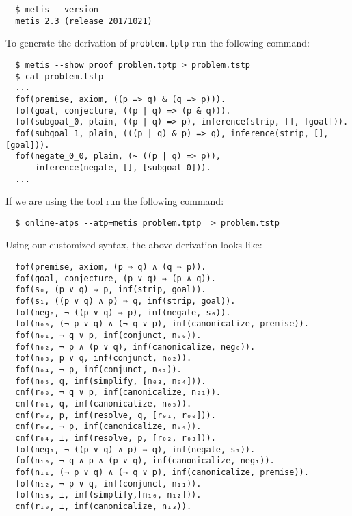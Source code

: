 \documentclass[../main.tex]{subfiles}
\begin{document}
\begin{subappendices}
\begin{verbatim}
  $ metis --version
  metis 2.3 (release 20171021)
\end{verbatim}

To generate the \TSTP derivation of \verb!problem.tptp!
run the following command:

\begin{verbatim}
  $ metis --show proof problem.tptp > problem.tstp
  $ cat problem.tstp
  ...
  fof(premise, axiom, ((p => q) & (q => p))).
  fof(goal, conjecture, ((p | q) => (p & q))).
  fof(subgoal_0, plain, ((p | q) => p), inference(strip, [], [goal])).
  fof(subgoal_1, plain, (((p | q) & p) => q), inference(strip, [], [goal])).
  fof(negate_0_0, plain, (~ ((p | q) => p)),
      inference(negate, [], [subgoal_0])).
  ...
\end{verbatim}

If we are using the  tool run the following command:

\begin{verbatim}
  $ online-atps --atp=metis problem.tptp  > problem.tstp
\end{verbatim}

Using our customized \TSTP syntax, the above \Metis derivation looks like:

\begin{verbatim}
  fof(premise, axiom, (p ⇒ q) ∧ (q ⇒ p)).
  fof(goal, conjecture, (p ∨ q) ⇒ (p ∧ q)).
  fof(s₀, (p ∨ q) ⇒ p, inf(strip, goal)).
  fof(s₁, ((p ∨ q) ∧ p) ⇒ q, inf(strip, goal)).
  fof(neg₀, ¬ ((p ∨ q) ⇒ p), inf(negate, s₀)).
  fof(n₀₀, (¬ p ∨ q) ∧ (¬ q ∨ p), inf(canonicalize, premise)).
  fof(n₀₁, ¬ q ∨ p, inf(conjunct, n₀₀)).
  fof(n₀₂, ¬ p ∧ (p ∨ q), inf(canonicalize, neg₀)).
  fof(n₀₃, p ∨ q, inf(conjunct, n₀₂)).
  fof(n₀₄, ¬ p, inf(conjunct, n₀₂)).
  fof(n₀₅, q, inf(simplify, [n₀₃, n₀₄])).
  cnf(r₀₀, ¬ q ∨ p, inf(canonicalize, n₀₁)).
  cnf(r₀₁, q, inf(canonicalize, n₀₅)).
  cnf(r₀₂, p, inf(resolve, q, [r₀₁, r₀₀])).
  cnf(r₀₃, ¬ p, inf(canonicalize, n₀₄)).
  cnf(r₀₄, ⊥, inf(resolve, p, [r₀₂, r₀₃])).
  fof(neg₁, ¬ ((p ∨ q) ∧ p) ⇒ q), inf(negate, s₁)).
  fof(n₁₀, ¬ q ∧ p ∧ (p ∨ q), inf(canonicalize, neg₁)).
  fof(n₁₁, (¬ p ∨ q) ∧ (¬ q ∨ p), inf(canonicalize, premise)).
  fof(n₁₂, ¬ p ∨ q, inf(conjunct, n₁₁)).
  fof(n₁₃, ⊥, inf(simplify,[n₁₀, n₁₂])).
  cnf(r₁₀, ⊥, inf(canonicalize, n₁₃)).
\end{verbatim}


\end{subappendices}
\end{document}
